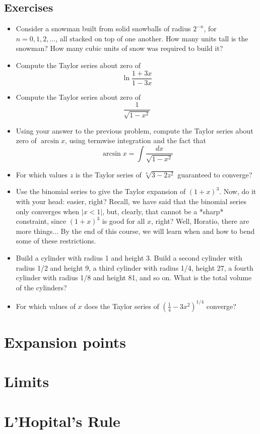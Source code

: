 \documentclass{book}
\begin{document}
\begin{sloppypar}
\subsection{Exercises}
\begin{itemize}
\item Consider a snowman built from solid snowballs of radius $2^{-n}$, for $n=0,1,2,\ldots $, all stacked on top of one another. How many units tall is the snowman? How many cubic units of snow was required to build it?
\item Compute the Taylor series about zero of \[ \ln\frac{1+3x}{1-3x} \]
\item Compute the Taylor series about zero of \[ \frac{1}{\sqrt{1-x^2}} \]
\item Using your answer to the previous problem, compute the Taylor series about zero of $\arcsin x$, using termwise integration and the fact that \[ \arcsin x = \int \frac{dx}{\sqrt{1-x^2}} \]
\item For which values $z$ is the Taylor series of $\sqrt[4]{3-2z^2}$ guaranteed to converge?
\item Use the binomial series to give the Taylor expansion of $(1+x)^3$. Now, do it with your head: easier, right? Recall, we have said that the binomial series only converges when $|x<1|$, but, clearly, that cannot be a *sharp* constraint, since $(1+x)^3$ is good for all $x$, right? Well, Horatio, there are more things... By the end of this course, we will learn when and how to bend some of these restrictions.
\item Build a cylinder with radius 1 and height 3. Build a second cylinder with radius 1/2 and height 9, a third cylinder with radius 1/4, height 27, a fourth cylinder with radius 1/8 and height 81, and so on. What is the total volume of the cylinders?
\item For which values of $x$ does the Taylor series of $(\frac{1}{4}-3x^2)^{1/4}$ converge?
\end{itemize}

\section{Expansion points} \label{ChFunctionsSecExpansionPoints}
\section{Limits} \label{ChFunctionsSecLimits}
\section{L'Hopital's Rule} \label{ChFunctionsSecLHopitalsRule}

\end{sloppypar}
\end{document}
